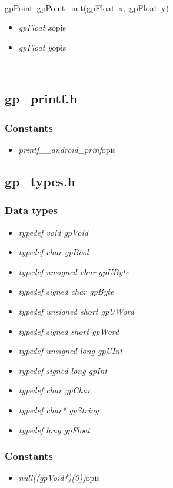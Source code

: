  \ \\
\mbox{\textsf{gpPoint gpPoint_init(gpFloat x, gpFloat y)}}
	\begin{itemize}
		\item \textit{gpFloat x}\quad opis
		\item \textit{gpFloat y}\quad opis
	\end{itemize}

 \ \\

\subsection{gp_printf.h}
\subsubsection{Constants}
\begin{itemize}
\item \textit{printf\quad __android_prinf}\qquad opis
\end{itemize}

\subsection{gp_types.h}
\subsubsection{Data types}
\begin{itemize}
\item \textit{typedef void gpVoid}
\item \textit{typedef char gpBool}
\item \textit{typedef unsigned char gpUByte}
\item \textit{typedef signed char gpByte}
\item \textit{typedef unsigned short gpUWord}
\item \textit{typedef signed short gpWord}
\item \textit{typedef unsigned long gpUInt}
\item \textit{typedef signed long gpInt}
\item \textit{typedef char gpChar}
\item \textit{typedef char* gpString}
\item \textit{typedef long gpFloat}
\end{itemize}
\subsubsection{Constants}
\begin{itemize}
\item \textit{null\quad ((gpVoid*)(0))}\qquad opis
\end{itemize}

